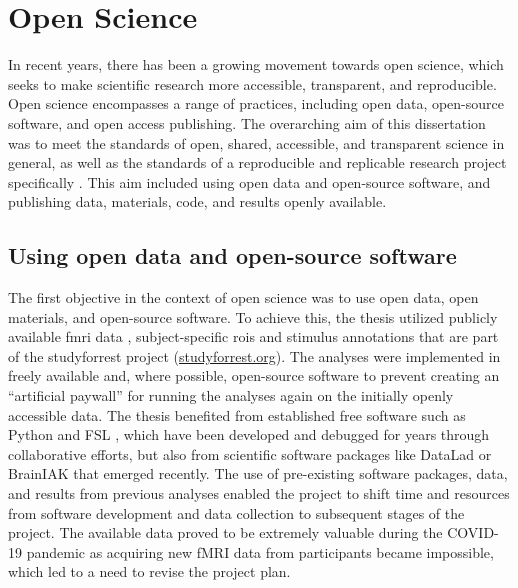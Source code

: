 \section{Open Science}

In recent years, there has been a growing movement towards open science, which
seeks to make scientific research more accessible, transparent, and
reproducible.
%
Open science encompasses a range of practices, including open data, open-source
software, and open access publishing.
%
The overarching aim of this dissertation was to meet the standards of open,
shared, accessible, and transparent science in general, as well as the standards
of a reproducible and replicable research project specifically
\citep[cf.][]{watson2015will, fecher2014open}.
%
This aim included using open data and open-source software, and publishing data,
materials, code, and results openly available.


\subsection{Using open data and open-source software}

%
The first objective in the context of open science was to use open data, open
materials, and open-source software.
%
To achieve this, the thesis utilized publicly available
%
\ac{fmri} data \citep{hanke2014audiomovie, hanke2016simultaneous,
sengupta2016extension},
%
subject-specific \acp{roi} \citep{sengupta2016extension} and
%
stimulus annotations \citep{haeusler2016cutanno}
%
that are part of the studyforrest project
(\href{www.studyforrest.org}{\url{studyforrest.org}}).
%
The analyses were implemented in freely available and, where possible,
open-source software to prevent creating an ``artificial paywall'' for running
the analyses again on the initially openly accessible data.
%
The thesis benefited from established free software such as
%
Python and
%
FSL \citep[\href{https://www.fmrib.ox.ac.uk/fsl}{FMRIB's Software
Library;}][]{smith2004fsl}, which have been developed and debugged for years
through collaborative efforts,
%
but also from scientific software packages like
%
DataLad
\citep[\href{www.datalad.org}{\url{datalad.org}};][]{halchenko2021datalad} or
%
BrainIAK
\citep[\href{https://brainiak.org}{\url{brainiak.org}};][]{kumar2020brainiak,
kumar2020brainiaktutorial}
%
that emerged recently.
%
The use of pre-existing software packages, data, and results from previous
analyses enabled the project to shift time and resources from software
development and data collection to subsequent stages of the project.
%
The available data proved to be extremely valuable during the COVID-19 pandemic
as acquiring new fMRI data from participants became impossible, which led to a
need to revise the project plan.

